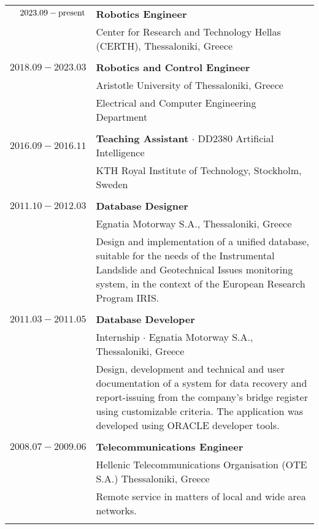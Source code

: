 \documentclass[a4paper,10pt,twoside]{article}
\begin{document}
\begin{tabular}{rp{11cm}}
$2023.09 - \hfill \textnormal{present} \hfill$ & \textbf{Robotics Engineer} \\
                                                           & Center for Research and Technology Hellas (CERTH), Thessaloniki, Greece\\
&\\
$2018.09 - 2023.03$ & \textbf{Robotics and Control Engineer} \\
                    & Aristotle University of Thessaloniki, Greece\\
                    & Electrical and Computer Engineering Department \\
&\\
$2016.09 - 2016.11$ & \textbf{Teaching Assistant} $\cdot$  DD2380 Artificial Intelligence \\
                    & KTH Royal Institute of Technology, Stockholm, Sweden\\
&\\

$2011.10 - 2012.03$ & \textbf{Database Designer} \\
                    & Egnatia Motorway S.A., Thessaloniki, Greece \\
& \small{Design and implementation of a unified database, suitable for the needs of the
Instrumental Landslide and Geotechnical Issues
monitoring system, in the context of the European Research Program IRIS.
}\\
\multicolumn{2}{c}{} \\


$2011.03 - 2011.05$ & \textbf{Database Developer} \\
                    & Internship $\cdot$ Egnatia Motorway S.A., Thessaloniki, Greece\\
& \small{Design, development and technical and user documentation of a system for data
recovery and report-issuing from the company's bridge register using
customizable criteria. The application was developed using ORACLE developer tools.
}\\
\multicolumn{2}{c}{} \\


$2008.07 - 2009.06$ & \textbf{Telecommunications Engineer} \\
  & Hellenic Telecommunications Organisation (OTE S.A.) Thessaloniki, Greece\\
& \small{Remote service in matters of local and wide area networks.
}\\
&\\
\end{tabular}
\end{document}
